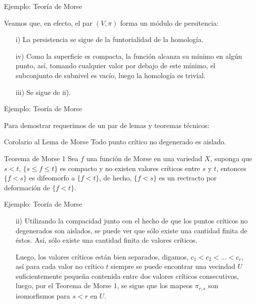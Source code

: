\documentclass{beamer}
\begin{document}
\begin{frame}{Ejemplo: Teoría de Morse}

Veamos que, en efecto, el par $(V,\pi)$ forma un módulo de persitencia:

\begin{itemize}
    \item[i)] La persistencia se sigue de la funtorialidad de la homología.
    \pause
    \item[iv)] Como la superficie es compacta, la función alcanza su mínimo en algún punto, así, tomando cualquier valor por debajo de este mínimo, el subconjunto de subnivel es vacío, luego la homología es trivial.
    \pause
    \item[iii)] Se sigue de ii).
    
\end{itemize}
    
\end{frame}

\begin{frame}{Ejemplo: Teoría de Morse}

Para demostrar requerimos de un par de lemas y teoremas técnicos:
\pause
\begin{block}{Corolario al Lema de Morse}
Todo punto crítico no degenerado es aislado.
\end{block}
\pause
\begin{block}{Teorema de Morse 1}
Sea $f$ una función de Morse en una variedad $X$, suponga que $s<t$, $\{s\leq f\leq t\}$ es compacto y no existen valores críticos entre $s$ y $t$, entonces $\{f<s\}$ es difeomorfo a $\{f<t\}$, de hecho, $\{f<s\}$ es un rectracto por deformación de $\{f<t\}$.
\end{block}
    
\end{frame}

\begin{frame}{Ejemplo: Teoría de Morse}

\begin{itemize}
    \item[ii)] Utilizando la compacidad junto con el hecho de que los puntos críticos no degenerados son aislados, se puede ver que sólo existe una cantidad finita de éstos. Así, sólo existe una cantidad finita de valores críticos.

    \pause

    Luego, los valores críticos están bien separados, digamos, $c_1 < c_2 < ... < c_r$, así para cada valor no crítico $t$ siempre se puede encontrar una vecindad $U$ suficientemente pequeña contenida entre dos valores críticos consecutivos, luego, por el Teorema de Morse 1, se sigue que los mapeos $\pi_{r,s}$ son isomorfismos para $s<r$ en $U$.

\end{itemize}

\end{frame}
\end{document}
